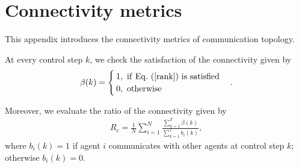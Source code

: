 \documentclass[letterpaper, 10 pt, conference]{ieeeconf} %
\begin{document}
\appendix

\section{Connectivity metrics}
This appendix introduces the connectivity metrics of communication topology.

At every control step $k$, we check the satisfaction of the connectivity given by
\begin{eqnarray}
\beta(k)=
\begin{cases}
1,\ {\rm if}\ {\rm Eq.}\ (\ref{rank})\ {\rm is}\ {\rm satisfied} \\
0,\ {\rm otherwise}
\end{cases}.
\nonumber
\end{eqnarray}

Moreover, we evaluate the ratio of the connectivity given by
\begin{eqnarray}
R_c=\frac{1}{N}\sum^N_{i=1}\frac{\sum^T_{k=1}\beta(k)}{\sum^T_{k=1}b_i(k)},
\nonumber
\end{eqnarray}
where $b_i(k)=1$ if agent $i$ communicates with other agents at control step $k$; otherwise $b_i(k)=0$.
\end{document}
